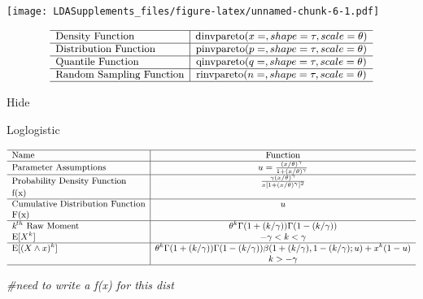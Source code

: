\documentclass[]{book}
\newenvironment{Shaded}{\begin{snugshade}}{\end{snugshade}}
\newcommand{\CommentTok}[1]{\textcolor[rgb]{0.56,0.35,0.01}{\textit{#1}}}
\begin{document}
\texttt{[image: LDASupplements\_files/figure-latex/unnamed-chunk-6-1.pdf]}

\[
{\small
\begin{matrix}
\begin{array}{l|c}
\hline
  \text{Density Function} & \text{dinvpareto}(x=, shape=\tau, scale=\theta) \\
\hline
  \text{Distribution Function} & \text{pinvpareto}(p=, shape=\tau,scale=\theta) \\
\hline
  \text{Quantile Function} & \text{qinvpareto}(q=, shape=\tau,scale=\theta) \\ 
\hline
  \text{Random Sampling Function} & \text{rinvpareto}(n=, shape=\tau,scale=\theta) \\
\hline
\end{array}
\end{matrix}
}
\]

\hypertarget{2pC}{}
{Hide}

Loglogistic

\[
{\small
\begin{matrix}
\begin{array}{l|c}
\hline
  \text{Name} & \text{Function} \\
\hline
  \text{Parameter Assumptions} & u=\frac{(x/\theta)^\gamma}{1+(x/\theta)^\gamma} \\
\hline
  \text{Probability Density Function} & \frac{\gamma(x/\theta)^\gamma}{x[1+(x/\theta)^\gamma]^2} \\
    \text{f(x)} & \\
\hline
  \text{Cumulative Distribution Function} & u \\
    \text{F(x)} & \\
\hline
  \textit{k}^{th}~\text{Raw Moment} & \theta^k\Gamma(1+(k/\gamma))\Gamma(1-(k/\gamma)) \\
  \mathrm{E}[X^k]  & -\gamma<k<\gamma \\
\hline
  \mathrm{E}[(X\wedge x)^k] & \theta^k\Gamma(1+(k/\gamma))\Gamma(1-(k/\gamma))\beta(1+(k/\gamma),1-(k/\gamma);u)+x^k(1-u) \\
  & k>-\gamma \\
\hline
\end{array}
\end{matrix}
}
\]

\begin{Shaded}
\begin{Highlighting}[]
\CommentTok{#need to write a f(x) for this dist}
\end{Highlighting}
\end{Shaded}
\end{document}
